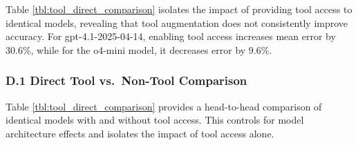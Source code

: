 \documentclass[
  10pt,
  twocolumn]{article}
\begin{document}
Table \ref{tbl:tool_direct_comparison} isolates the impact of providing
tool access to identical models, revealing that tool augmentation does
not consistently improve accuracy. For gpt-4.1-2025-04-14, enabling tool
access increases mean error by 30.6\%, while for the o4-mini model, it
decreases error by 9.6\%.

\subsubsection{D.1 Direct Tool vs.~Non-Tool
Comparison}\label{d.1-direct-tool-vs.-non-tool-comparison}

Table \ref{tbl:tool_direct_comparison} provides a head-to-head
comparison of identical models with and without tool access. This
controls for model architecture effects and isolates the impact of tool
access alone.
\end{document}
